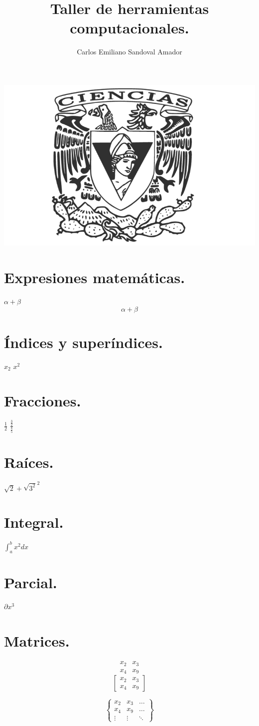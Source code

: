 \documentclass{article}
\title{\Huge Taller de herramientas computacionales.}
\author{Carlos Emiliano Sandoval Amador}
\begin{document}
	\maketitle
	\begin{center}
		\includegraphics[scale=0.40]{ciencias.png}
	\end{center}
	\section*{Expresiones matemáticas.}
	$\alpha + \beta$ \\
	\[\alpha + \beta\]
	\section*{Índices y superíndices.}
	$x_{2}$ $x^{2}$
	\section*{Fracciones.}
	$\frac{1}{2}$
	$\frac{\frac{3}{2}}{\frac{4}{5}}$
	\section*{Raíces.}
	$\sqrt{2} + \sqrt{3^2}^2$
	\section*{Integral.}
	$\int_{a}^{b}x^2dx$
	\section*{Parcial.}
	$\partial x^3$
	\section*{Matrices.}
\[
	\begin{matrix}
		x_{2} & x_{3} \\
		x_{4} & x_{9}
	\end{matrix}
\]
\[
	\begin{bmatrix}
		x_{2} & x_{3} \\
		x_{4} & x_{9}
	\end{bmatrix}	
\]


\[
	\begin{Bmatrix}
		x_{2} & x_{3} & \dots \\
		x_{4} & x_{9} & \dots \\
		\vdots & \vdots & \ddots
	\end{Bmatrix}	
\]	
	
\end{document}
